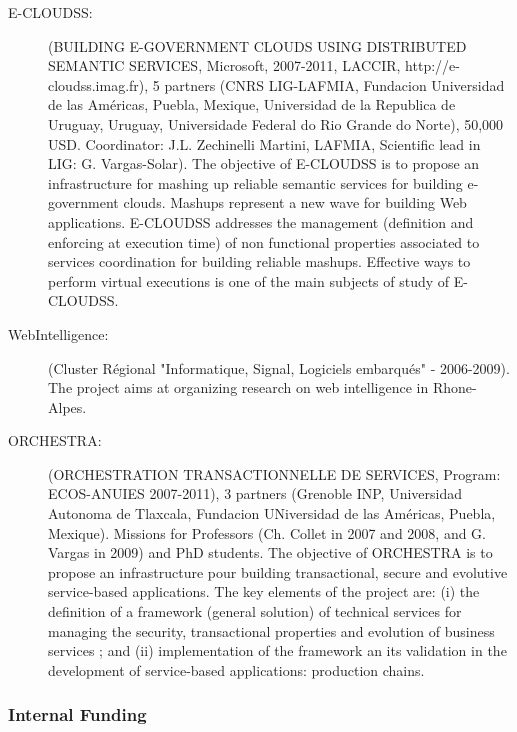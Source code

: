 \begin{description}

\item[E-CLOUDSS:] (BUILDING E-GOVERNMENT CLOUDS USING DISTRIBUTED SEMANTIC SERVICES, Microsoft, 2007-2011, LACCIR, http://e-cloudss.imag.fr), 5 partners (CNRS LIG-LAFMIA, Fundacion Universidad de las Am{\'e}ricas, Puebla, Mexique, Universidad de la Republica de Uruguay, Uruguay, Universidade Federal do Rio Grande do Norte), 50,000 USD. Coordinator: J.L. Zechinelli Martini, LAFMIA, Scientific lead in LIG: G. Vargas-Solar). 
The objective of E-CLOUDSS is to propose an infrastructure for mashing up reliable semantic services for building e-government clouds. Mashups represent a new wave for building Web applications. E-CLOUDSS addresses the management (definition and enforcing at execution time) of non functional properties associated to services coordination for building reliable mashups. Effective ways to perform virtual executions is one of the main subjects of study of E-CLOUDSS.

\item[WebIntelligence:] (Cluster R{\'e}gional "Informatique, Signal, Logiciels embarqu{\'e}s" - 2006-2009). The project aims at organizing research on web intelligence in Rhone-Alpes. 

\item[ORCHESTRA:] (ORCHESTRATION TRANSACTIONNELLE DE SERVICES, Program: ECOS-ANUIES 2007-2011), 3 partners (Grenoble INP, Universidad Autonoma de Tlaxcala, Fundacion UNiversidad de las Am{\'e}ricas, Puebla, Mexique). Missions for Professors (Ch. Collet in 2007 and  2008, and G. Vargas in 2009) and PhD students. The objective of ORCHESTRA is to propose an infrastructure pour building transactional, secure and evolutive service-based applications. The key elements of the project are: (i) the definition of a framework (general solution) of technical services for managing the security, transactional properties and evolution of business services ; and (ii) implementation of the framework an its validation in the development of service-based applications: production chains. 

\end{description}

\subsubsection{Internal Funding}

